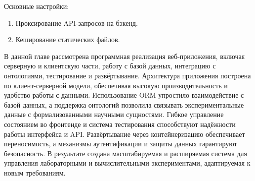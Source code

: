 Основные настройки:
\begin{enumerate}
    \item Проксирование API-запросов на бэкенд.
    \item Кеширование статических файлов.
\end{enumerate}


В данной главе рассмотрена программная реализация веб-приложения, включая серверную и клиентскую части, работу с базой данных, интеграцию с онтологиями, тестирование и развёртывание. Архитектура приложения построена по клиент-серверной модели, обеспечивая высокую производительность и удобство работы с данными. Использование ORM упростило взаимодействие с базой данных, а поддержка онтологий позволила связывать экспериментальные данные с формализованными научными сущностями. Гибкое управление состоянием во фронтенде и система тестирования способствуют надёжности работы интерфейса и API. Развёртывание через контейнеризацию обеспечивает переносимость, а механизмы аутентификации и защиты данных гарантируют безопасность. В результате создана масштабируемая и расширяемая система для управления лабораторными и вычислительными экспериментами, адаптируемая к новым требованиям.